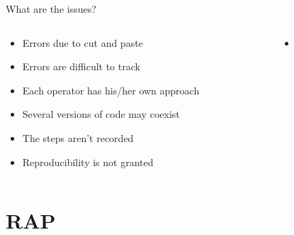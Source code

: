 \documentclass[xcolor=x11names,compress]{beamer}
\renewcommand{\(}{\begin{columns}}
\renewcommand{\)}{\end{columns}}
\newcommand{\<}[1]{\begin{column}{#1}}
\renewcommand{\>}{\end{column}}
\begin{document}
\begin{frame}{What are the issues?}
  \begin{columns}[T]
    \begin{column}{0.5\textwidth}
      \begin{itemize}[<+->]
        \item Errors due to cut and paste
        \item Errors are difficult to track
        \item Each operator has his/her own approach
        \item Several versions of code may coexist
        \item The steps aren't recorded
        \item Reproducibility is not granted
      \end{itemize}
    \end{column}
    \begin{column}{0.5\textwidth}
    \begin{itemize}
        \item[]  
         \end{itemize}
    \end{column}
  \end{columns}
\end{frame}


\section{RAP}  %
\end{document}
